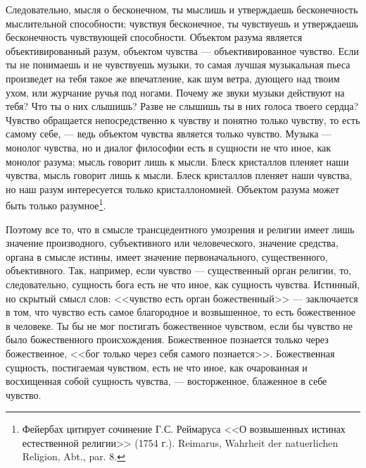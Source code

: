 \documentclass[12pt,oneside]{book}
\newcommand{\rom}[1]{\uppercase\expandafter{\romannumeral #1\relax}}
\begin{document}
Следовательно, мысля о бесконечном, ты мыслишь и утверждаешь бесконечность мыслительной способности; чувствуя бесконечное, ты чувствуешь и утверждаешь бесконечность чувствующей способности. Объектом разума является объективированный разум, объектом чувства --- объективированное чувство. Если ты не понимаешь и не чувствуешь музыки, то самая лучшая музыкальная пьеса произведет на тебя такое же впечатление, как шум ветра, дующего над твоим ухом, или журчание ручья под ногами. Почему же звуки музыки действуют на тебя? Что ты о них слышишь? Разве не слышишь ты в них голоса твоего сердца? Чувство обращается непосредственно к чувству и понятно только чувству, то есть самому себе, --- ведь объектом чувства является только чувство. Музыка --- монолог чувства, но и диалог философии есть в сущности не что иное, как монолог разума; мысль говорит лишь к мысли. Блеск кристаллов пленяет наши чувства, мысль говорит лишь к мысли. Блеск кристаллов пленяет наши чувства, но наш разум интересуется только кристаллономией. Объектом разума может быть только разумное\dag\let\svthefootnote\thefootnote\let\thefootnote\relax{}\let\thefootnote\svthefootnote\footnote{Фейербах цитирует сочинение Г.С. Реймаруса <<О возвышенных истинах естественной религии>> (1754 г.). Reimarus, Wahrheit der natuerlichen Religion, \rom{4} Abt., par. 8.}.





Поэтому все то, что в смысле трансцедентного умозрения и религии имеет лишь значение производного, субъективного или человеческого, значение средства, органа в смысле истины, имеет значение первоначального, существенного, объективного. Так, например, если чувство --- существенный орган религии, то, следовательно, сущность бога есть не что иное, как сущность чувства. Истинный, но скрытый смысл слов: <<чувство есть орган божественный>> --- заключается в том, что чувство есть самое благородное и возвышенное, то есть божественное в человеке. Ты бы не мог постигать божественное чувством, если бы чувство не было божественного происхождения. Божественное познается только через божественное, <<бог только через себя самого познается>>. Божественная сущность, постигаемая чувством, есть не что иное, как очарованная и восхищенная собой сущность чувства, --- восторженное, блаженное в себе чувство.
\end{document}
